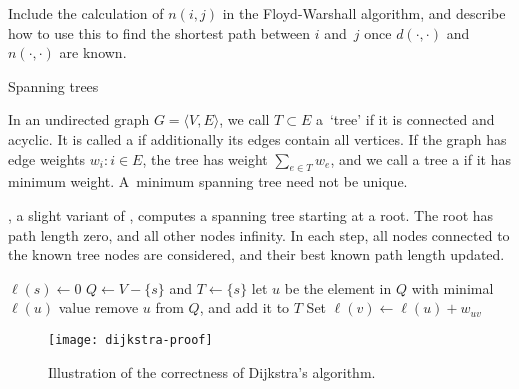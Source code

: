 \begin{exercise}
  Include the calculation of $n(i,j)$ in the Floyd-Warshall algorithm,
  and describe how to use this to find the shortest path between $i$
  and~$j$ once $d(\cdot,\cdot)$ and $n(\cdot,\cdot)$ are known.
\end{exercise}


 {Spanning trees}
\label{sec:dijkstra}

In an undirected graph $G=\langle V,E\rangle$, we call $T\subset E$ a~`tree'
if it is connected and acyclic. It is called a 
if additionally its edges contain all vertices.
If the graph has edge weights
$w_i\colon i\in E$, the tree has weight $\sum_{e\in T} w_e$, and
we call a tree a  if it has minimum weight.
A~minimum spanning tree need not be unique.

, a slight variant of
, computes a spanning
tree starting at a root. The root has path length zero, and all other
nodes infinity.  In each step, all nodes connected to the known tree
nodes are considered, and their best known path length updated.

\begin{displayalgorithm}
  $\ell(s)\leftarrow 0$\;
  $Q\leftarrow V-\{s\}$ and $T\leftarrow \{s\}$\;
   {
    let $u$ be the element in $Q$ with minimal $\ell(u)$ value\;
    remove $u$ from $Q$, and add it to $T$\;
     {
       {Set $\ell(v)\leftarrow \ell(u)+w_{uv}$}
    }
  }
\end{displayalgorithm}

\begin{figure}[ht]
  \texttt{[image: dijkstra-proof]}
  \caption{Illustration of the correctness of Dijkstra's algorithm.}
  \label{fig:dijkstra-proof}
\end{figure}

